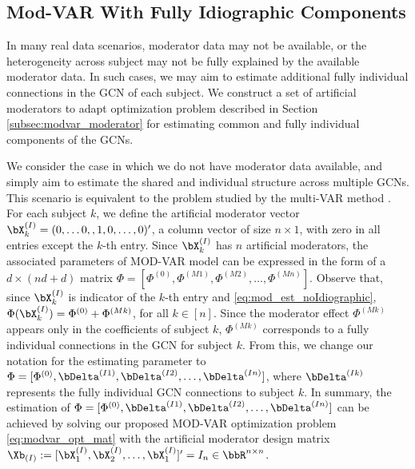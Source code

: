 \subsection{Mod-VAR With Fully Idiographic Components}\label{subsec:modvar_idiographic}

In many real data scenarios, moderator data may not be available, or the heterogeneity across subject may not be fully explained by the available moderator data. In such cases, we may aim to estimate additional fully individual connections in the GCN of each subject.  We construct a set of artificial moderators to adapt optimization problem described in Section \ref{subsec:modvar_moderator} for estimating common and fully individual components of the GCNs.

We consider the case in which we do not have moderator data available, and simply aim to estimate the shared and individual structure across multiple GCNs. This scenario is equivalent to the problem studied by the multi-VAR method \citep{fisher2022penalized}. For each subject $k$, we define the artificial moderator vector $\bX_k^{(I)} = (0,\ldots 0,,1,0,\ldots , 0)'$, a column vector of size $n\times 1$, with zero in all entries except the $k$-th entry. Since $\bX_k^{(I)}$ has $n$ artificial moderators, the associated parameters of MOD-VAR model can be expressed in the form of a $d\times (nd+d)$ matrix $\Phi = [\Phi^{(0)},\Phi^{(M1)},\Phi^{(M2)}, \ldots , \Phi^{(Mn)}]$. Observe that, since $\bX^{(I)}_k$ is indicator of the $k$-th entry and  \eqref{eq:mod_est_noIdiographic}, $\Phi(\bX_k^{(I)}) = \Phi^{(0)} + \Phi^{(Mk)}$,  for all $k\in[n]$. Since the moderator effect $\Phi^{(Mk)}$ appears only in the coefficients of subject $k$, $\Phi^{(Mk)}$ corresponds to a fully individual connections in the GCN for subject $k$. From this, we change our notation for the estimating parameter to $\Phi = [\Phi^{(0)},\bDelta^{(I1)},\bDelta^{(I2)}, \ldots , \bDelta^{(In)}]$, where $\bDelta^{(Ik)}$ represents the fully individual GCN connections to subject $k$. In summary, the estimation of $\Phi = [\Phi^{(0)},\bDelta^{(I1)},\bDelta^{(I2)}, \ldots , \bDelta^{(In)}]$ can be achieved by solving our proposed  MOD-VAR optimization problem \eqref{eq:modvar_opt_mat} with the artificial moderator design matrix $\Xb_{(I)} := [\bX^{(I)}_1, \bX^{(I)}_2, \ldots, \bX^{(I)}_1]' = I_n\in\bbR^{n\times n}$.

